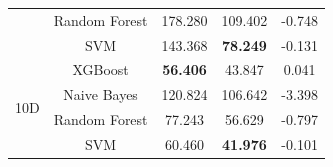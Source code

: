 \documentclass[conference]{IEEEtran}
\begin{document}
\begin{table}[!t]
\begin{tabular}{c|c|c|c|c}
		&Random Forest& 178.280 & 109.402 & -0.748 \\
		& SVM & 143.368 & \textbf{78.249} & -0.131 \\
		\hline
		\multirow{4}{*}{10D}
		&XGBoost& \textbf{56.406} & 43.847 & 0.041 \\
		&Naive Bayes& 120.824 & 106.642 & -3.398 \\
		&Random Forest& 77.243 & 56.629 & -0.797 \\
		& SVM & 60.460 & \textbf{41.976} & -0.101 \\
	\end{tabular}
\end{table}



\end{document}

